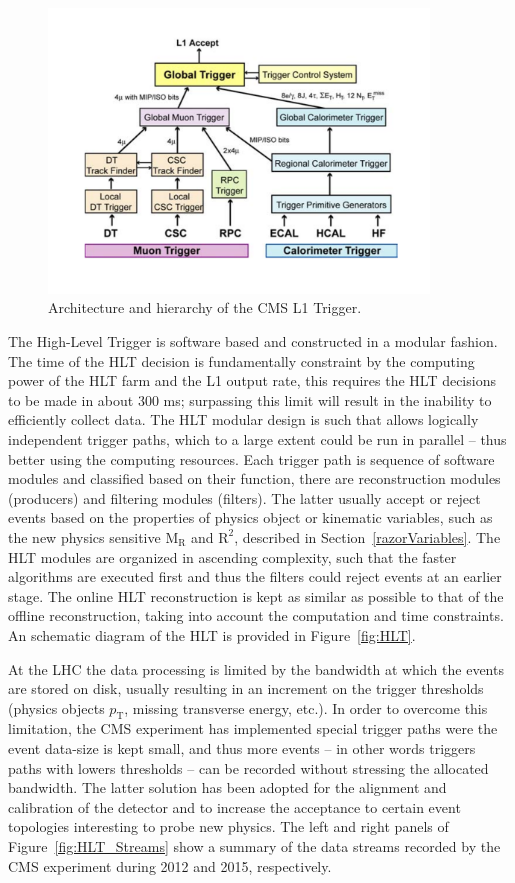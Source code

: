 \begin{figure}
 \centering
\includegraphics[width=0.9\textwidth]{CMS_DetectorFigures/L1Trigger.pdf}
\caption{Architecture and hierarchy of the CMS L1 Trigger.\label{fig:L1}}
\end{figure}

The High-Level Trigger is software based and constructed in a modular
fashion. The time of the HLT decision is fundamentally constraint by
the computing power of the HLT farm and the L1 output rate, this
requires the HLT decisions to be made in about 300 ms; surpassing this
limit will result in the inability to efficiently collect data. The
HLT modular design is such that allows logically independent trigger
paths, which to a large extent could be run in parallel -- thus better
using the computing resources. Each trigger path is sequence of
software modules and classified based on their function, there are
reconstruction modules (producers) and filtering modules
(filters). The latter usually accept or reject events based on the
properties of physics object or kinematic variables, such as the new
physics sensitive $\mathrm{M_{R}}$ and $\mathrm{R^{2}}$, described in
Section~\ref{razorVariables}. The HLT modules are organized in
ascending complexity, such that the faster algorithms are executed
first and thus the filters could reject events at an earlier
stage. The online HLT reconstruction is kept as similar as
possible to that of the offline reconstruction, taking into account
the computation and time constraints. An schematic diagram of the HLT
is provided in Figure~\ref{fig:HLT}. 

At the LHC the data processing is limited by the bandwidth at which
the events are stored on disk, usually resulting in an increment on
the trigger thresholds (physics objects $p_{\mathrm{T}}$, missing
transverse energy, etc.). In order to overcome this limitation, the
CMS experiment has implemented special trigger paths were the event
data-size is kept small, and thus more events -- in other words
triggers paths with lowers thresholds -- can be recorded without
stressing the allocated bandwidth. The latter solution has been
adopted for the alignment and calibration of the detector and to
increase the acceptance to certain event topologies interesting to
probe new physics. The left and right panels of Figure~\ref{fig:HLT_Streams} show a summary of the
data streams recorded by the CMS experiment during 2012 and 2015,
respectively.

